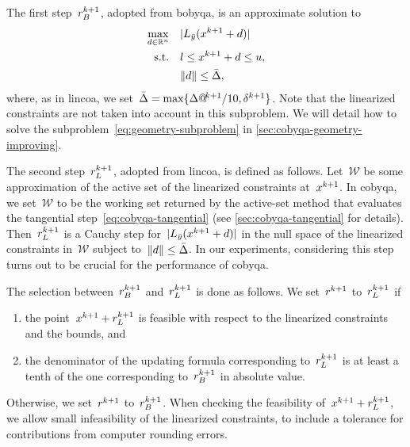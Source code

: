 The first step~$\rstep[k + 1]_B$, adopted from \gls{bobyqa}, is an approximate solution to
\begin{subequations}
    \label{eq:geometry-subproblem}
    \begin{align}
        \max_{\step \in \R^n}   & \quad \abs{\lagp[\bar{y}](\iter[k + 1] + \step)}\\
        \text{s.t.}             & \quad \xl \le \iter[k + 1] + \step \le \xu,\\
                                & \quad \norm{\step} \le \bar{\rad},
    \end{align}
\end{subequations}
where, as in \gls{lincoa}, we set~$\bar{\rad} = \max \set{\rad[k + 1] / 10, \radlb[k + 1]}$.
Note that the linearized constraints are not taken into account in this subproblem.
We will detail how to solve the subproblem~\cref{eq:geometry-subproblem} in \cref{sec:cobyqa-geometry-improving}.

The second step~$\rstep[k + 1]_L$, adopted from \gls{lincoa}, is defined as follows.
Let~$\mathcal{W}$ be some approximation of the active set of the linearized constraints at~$\iter[k + 1]$.
In \gls{cobyqa}, we set~$\mathcal{W}$ to be the working set returned by the active-set method that evaluates the tangential step~\cref{eq:cobyqa-tangential} (see \cref{sec:cobyqa-tangential} for details).
Then~$\rstep[k + 1]_L$ is a Cauchy step for~$\abs{\lagp[\bar{y}](\iter[k + 1] + \step)}$ in the null space of the linearized constraints in~$\mathcal{W}$ subject to~$\norm{\step} \le \bar{\rad}$.
In our experiments, considering this step turns out to be crucial for the performance of \gls{cobyqa}.

The selection between~$\rstep[k + 1]_B$ and~$\rstep[k + 1]_L$ is done as follows.
We set~$\rstep[k + 1]$ to~$\rstep[k + 1]_L$ if
\begin{enumerate}
    \item the point~$\iter[k + 1] + \rstep[k + 1]_L$ is feasible with respect to the linearized constraints and the bounds, and
    \item the denominator of the updating formula corresponding to~$\rstep[k + 1]_L$ is at least a tenth of the one corresponding to~$\rstep[k + 1]_B$ in absolute value.
\end{enumerate}
Otherwise, we set~$\rstep[k + 1]$ to~$\rstep[k + 1]_B$.
When checking the feasibility of~$\iter[k + 1] + \rstep[k + 1]_L$, we allow small infeasibility of the linearized constraints, to include a tolerance for contributions from computer rounding errors.

